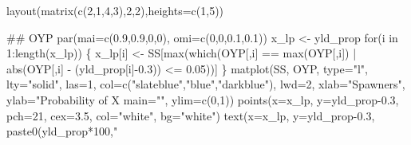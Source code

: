 \documentclass[
  11pt,
]{article}
\newenvironment{Shaded}{}{}
\newcommand{\CommentTok}[1]{\textcolor[rgb]{0.00,0.50,0.00}{#1}}
\newcommand{\ControlFlowTok}[1]{\textcolor[rgb]{0.00,0.00,1.00}{#1}}
\newcommand{\DataTypeTok}[1]{#1}
\newcommand{\DecValTok}[1]{#1}
\newcommand{\FloatTok}[1]{#1}
\newcommand{\KeywordTok}[1]{\textcolor[rgb]{0.00,0.00,1.00}{#1}}
\newcommand{\NormalTok}[1]{#1}
\newcommand{\OperatorTok}[1]{#1}
\newcommand{\StringTok}[1]{\textcolor[rgb]{0.00,0.50,0.50}{#1}}
\begin{document}
\begin{Shaded}
\begin{Highlighting}[]
\KeywordTok{layout}\NormalTok{(}\KeywordTok{matrix}\NormalTok{(}\KeywordTok{c}\NormalTok{(}\DecValTok{2}\NormalTok{,}\DecValTok{1}\NormalTok{,}\DecValTok{4}\NormalTok{,}\DecValTok{3}\NormalTok{),}\DecValTok{2}\NormalTok{,}\DecValTok{2}\NormalTok{),}\DataTypeTok{heights=}\KeywordTok{c}\NormalTok{(}\DecValTok{1}\NormalTok{,}\DecValTok{5}\NormalTok{))}

\CommentTok{## OYP}
\KeywordTok{par}\NormalTok{(}\DataTypeTok{mai=}\KeywordTok{c}\NormalTok{(}\FloatTok{0.9}\NormalTok{,}\FloatTok{0.9}\NormalTok{,}\DecValTok{0}\NormalTok{,}\DecValTok{0}\NormalTok{), }\DataTypeTok{omi=}\KeywordTok{c}\NormalTok{(}\DecValTok{0}\NormalTok{,}\DecValTok{0}\NormalTok{,}\FloatTok{0.1}\NormalTok{,}\FloatTok{0.1}\NormalTok{))}
\NormalTok{x_lp <-}\StringTok{ }\NormalTok{yld_prop}
\ControlFlowTok{for}\NormalTok{(i }\ControlFlowTok{in} \DecValTok{1}\OperatorTok{:}\KeywordTok{length}\NormalTok{(x_lp)) \{}
\NormalTok{  x_lp[i] <-}\StringTok{ }\NormalTok{SS[}\KeywordTok{max}\NormalTok{(}\KeywordTok{which}\NormalTok{(OYP[,i] }\OperatorTok{==}\StringTok{ }\KeywordTok{max}\NormalTok{(OYP[,i]) }\OperatorTok{|}\StringTok{ }\KeywordTok{abs}\NormalTok{(OYP[,i] }\OperatorTok{-}\StringTok{ }\NormalTok{(yld_prop[i]}\OperatorTok{-}\FloatTok{0.3}\NormalTok{)) }\OperatorTok{<=}\StringTok{ }\FloatTok{0.05}\NormalTok{))]}
\NormalTok{\}}
\KeywordTok{matplot}\NormalTok{(SS, OYP, }\DataTypeTok{type=}\StringTok{"l"}\NormalTok{, }\DataTypeTok{lty=}\StringTok{"solid"}\NormalTok{, }\DataTypeTok{las=}\DecValTok{1}\NormalTok{, }\DataTypeTok{col=}\KeywordTok{c}\NormalTok{(}\StringTok{"slateblue"}\NormalTok{,}\StringTok{"blue"}\NormalTok{,}\StringTok{"darkblue"}\NormalTok{), }\DataTypeTok{lwd=}\DecValTok{2}\NormalTok{,}
        \DataTypeTok{xlab=}\StringTok{"Spawners"}\NormalTok{, }\DataTypeTok{ylab=}\StringTok{"Probability of X%
        \DataTypeTok{main=}\StringTok{""}\NormalTok{, }\DataTypeTok{ylim=}\KeywordTok{c}\NormalTok{(}\DecValTok{0}\NormalTok{,}\DecValTok{1}\NormalTok{))}
\KeywordTok{points}\NormalTok{(}\DataTypeTok{x=}\NormalTok{x_lp, }\DataTypeTok{y=}\NormalTok{yld_prop}\FloatTok{-0.3}\NormalTok{, }\DataTypeTok{pch=}\DecValTok{21}\NormalTok{, }\DataTypeTok{cex=}\FloatTok{3.5}\NormalTok{, }\DataTypeTok{col=}\StringTok{"white"}\NormalTok{, }\DataTypeTok{bg=}\StringTok{"white"}\NormalTok{)}
\KeywordTok{text}\NormalTok{(}\DataTypeTok{x=}\NormalTok{x_lp, }\DataTypeTok{y=}\NormalTok{yld_prop}\FloatTok{-0.3}\NormalTok{, }\KeywordTok{paste0}\NormalTok{(yld_prop}\OperatorTok{*}\DecValTok{100}\NormalTok{,}\StringTok{"%
}}
\end{Highlighting}
\end{Shaded}
\end{document}

